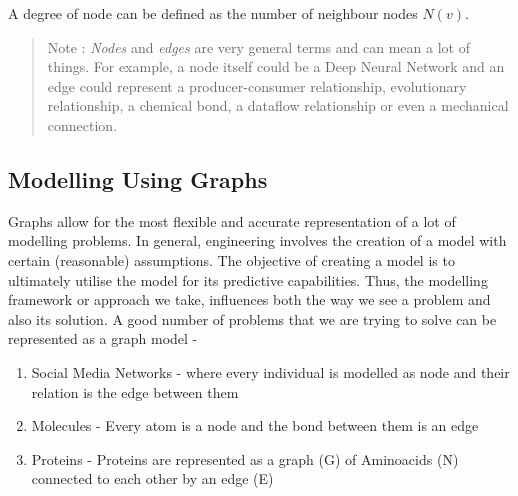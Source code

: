 
A degree of node can be defined as the number of neighbour nodes $N(v)$. 

\begin{quote}
    Note : \textit{Nodes} and \textit{edges} are very general terms and can mean a lot of things. For example, a node itself could be a Deep Neural Network and an edge could represent a producer-consumer relationship, evolutionary relationship, a chemical bond, a dataflow relationship or even a mechanical connection.
\end{quote}

\subsection{Modelling Using Graphs}
Graphs allow for the most flexible and accurate representation of a lot of modelling problems. In general, engineering involves the creation of a model with certain (reasonable) assumptions. The objective of creating a model is to ultimately utilise the model for its predictive capabilities. Thus, the modelling framework or approach we take, influences both the way we see a problem and also its solution. A good number of problems that we are trying to solve can be represented as a graph model - 
\begin{enumerate}
    \item Social Media Networks - where every individual is modelled as node and their relation is the edge between them 
    \item Molecules - Every atom is a node and the bond between them is an edge
    \item Proteins - Proteins are represented as a graph (G) of Aminoacids (N) connected to each other by an edge (E)
\end{enumerate}

%